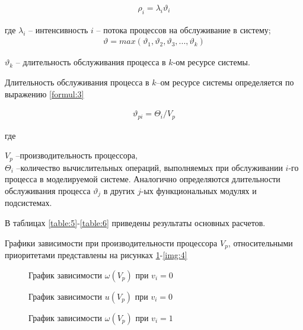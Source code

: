 \begin{align}
	\rho_i = \lambda_i\vartheta_i 
	\label{fig:m2}
\end{align}

где $\lambda_i$ -- интенсивность $i$ -- потока процессов на обслуживание в систему; \\

\begin{align}
\vartheta = max (\vartheta_1,\vartheta_2,\vartheta_3,...,\vartheta_k)
\label{formul:3}
\end{align}

$\vartheta_k$ -- длительность обслуживания процесса в $k$-ом ресурсе системы.

Длительность обслуживания процесса в $k$--ом ресурсе системы определяется по выражению \ref{formul:3}

\begin{align}
	\vartheta_{pi} =  \Theta_i/V_p
	\label{formul:4}
\end{align}

где 

$V_p$ --производительность процессора, \\
$\Theta_i$ --количество вычислительных операций, выполняемых при обслуживании $i$-го процесса в моделируемой системе. Аналогично определяются длительности обслуживания процесса $\vartheta_j$ в других $j$-ых функциональных модулях и подсистемах.

В таблицах \ref{table:5}-\ref{table:6} приведены результаты основных расчетов.




Графики зависимости при производительности процессора $V_p$,  относительными приоритетами представлены на рисунках \ref{img:1}-\ref{img:4}

\begin{figure}[H]
	\renewcommand{\figurename}{Рисунок}
	\caption{График зависимости $\omega(V_p)$ при $v_i = 0$}
	\label{img:1}
\end{figure}

\begin{figure}[H]
	\renewcommand{\figurename}{Рисунок}
	\caption{График зависимости $u(V_p)$ при $v_i = 0$}
	\label{img:2}
\end{figure}

\begin{figure}[H]
	\renewcommand{\figurename}{Рисунок}
	\caption{График зависимости $\omega(V_p)$ при $v_i = 1$}
	\label{img:3}
\end{figure}

